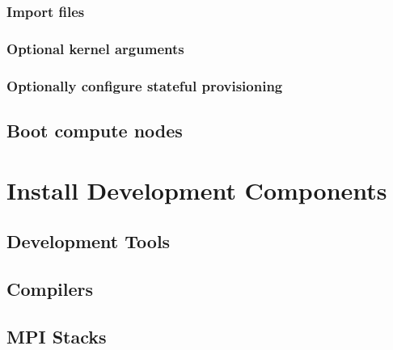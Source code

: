 \documentclass[letterpaper]{article}
\begin{document}
\vspace*{.25cm}
\subsubsection{Import files} \label{sec:file_import}


\vspace*{.7cm}



\clearpage


\subsubsection{Optional kernel arguments} \label{sec:optional_kargs}



\subsubsection{Optionally configure stateful provisioning}


\vspace*{0.35cm}
\subsection{Boot compute nodes} \label{sec:boot_computes}
 

\section{Install \OHPC{} Development Components}


\subsection{Development Tools} \label{sec:install_dev_tools}


\subsection{Compilers} \label{sec:install_compilers}


\subsection{MPI Stacks} \label{sec:mpi}

\end{document}
